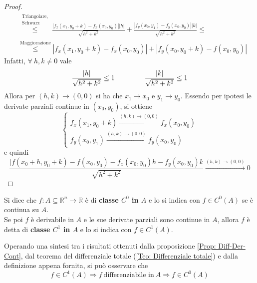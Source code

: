 \begin{proof}
\begin{equation}
\begin{aligned}
                &\overset{\substack{\text{Triangolare,}\\\text{Schwarz}}}{\leq} \frac{|f_x(x_1, y_0+k)-f_x(x_0, y_0)||h|}{\sqrt{h^2+k^2}}+\frac{|f_y(x_0, y_1)-f_y(x_0, y_0)||k|}{\sqrt{h^2+k^2}}\leq\\
                &\overset{\text{Maggiorazione}}{\leq} |f_x(x_1, y_0+k)-f_x(x_0, y_0)|+|f_y(x_0, y_0+k)-f(x_0, y_0)|
            \end{aligned}
        \end{equation}
        Infatti, $\forall\ h,k \neq 0$ vale
        \begin{equation}
            \frac{|h|}{\sqrt{h^2+k^2}}\leq 1 \hspace{1.5 cm} \frac{|k|}{\sqrt{h^2+k^2}}\leq 1
        \end{equation}
        Allora per $(h,k) \to (0,0)$ si ha che $x_1 \to x_0$ e $y_1 \to y_0$. Essendo per ipotesi le derivate parziali continue in $(x_0, y_0)$, si ottiene
        \begin{equation}
            \begin{cases}
                f_x(x_1, y_0+k) \overset{(h, k) \to (0,0)}{\to} f_x(x_0, y_0)\\
                f_y(x_0, y_1) \overset{(h, k) \to (0,0)}{\to} f_y(x_0, y_0)
            \end{cases}
        \end{equation} 
        e quindi 
        \begin{equation}
            \frac{|f(x_0+h, y_0+k)-f(x_0, y_0)-f_x(x_0, y_0)h-f_y(x_0, y_0)k}{\sqrt{h^2+k^2}} \overset{(h,k)\to(0,0)}{\to} 0
        \end{equation}
    \end{proof}
\begin{definition} \label{Def:C0 e C1}
    Si dice che $f:A \subseteq \mathbb{R}^n\to \mathbb{R}$ è di \textbf{classe $C^0$ in $A$} e lo si indica con $f \in C^0(A)$ se è continua su $A$.\\
    Se poi $f$ è derivabile in $A$ e le sue derivate parziali sono continue in $A$, allora $f$ è detta di \textbf{classe $C^1$ in $A$} e lo si indica con $f \in C^1(A)$.
\end{definition}
    \begin{oss}
        Operando una sintesi tra i risultati ottenuti dalla proposizione \ref{Prop: Diff-Der-Cont}, dal teorema del differenziale totale (\ref{Teo: Differenziale totale}) e dalla definizione appena fornita, si può osservare che
        \begin{equation} \label{Eq: Relazione C^1 -> diff -> C^0}
            f \in C^1(A) \Rightarrow f\ \text{differenziabile in}\ A \Rightarrow f \in C^{0}(A)
        \end{equation}
    \end{oss} 
